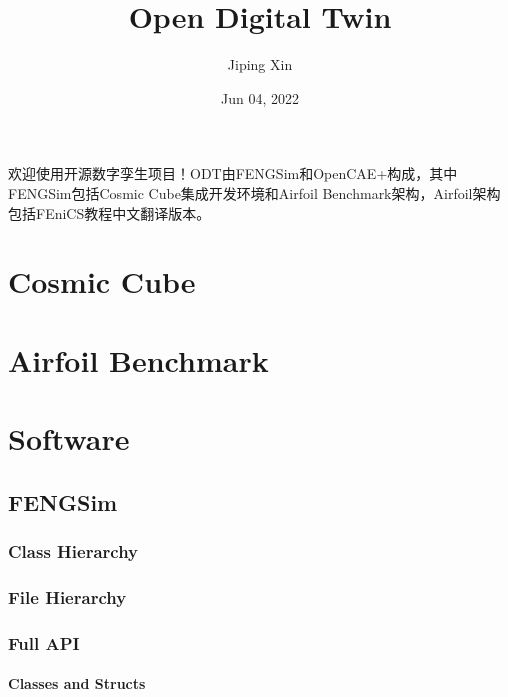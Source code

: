 \documentclass[letterpaper,10pt,english]{sphinxmanual}
\title{Open Digital Twin}
\date{Jun 04, 2022}
\author{Jiping Xin}
\begin{document}
\pagestyle{empty}
\sphinxmaketitle
\pagestyle{plain}
\sphinxtableofcontents
\pagestyle{normal}
\label{\detokenize{index::doc}}
\sphinxAtStartPar
欢迎使用开源数字孪生项目！ODT由FENGSim和OpenCAE+构成，其中FENGSim包括Cosmic Cube集成开发环境和Airfoil Benchmark架构，Airfoil架构包括FEniCS教程中文翻译版本。




\chapter{Cosmic Cube}
\label{\detokenize{index:cosmic-cube}}

\chapter{Airfoil Benchmark}
\label{\detokenize{index:airfoil-benchmark}}

\chapter{Software}
\label{\detokenize{index:software}}
\sphinxstepscope


\section{FENGSim}
\label{\detokenize{api/library_root:fengsim}}\label{\detokenize{api/library_root::doc}}

\subsection{Class Hierarchy}
\label{\detokenize{api/library_root:class-hierarchy}}



\subsection{File Hierarchy}
\label{\detokenize{api/library_root:file-hierarchy}}



\subsection{Full API}
\label{\detokenize{api/library_root:full-api}}

\subsubsection{Classes and Structs}
\label{\detokenize{api/library_root:classes-and-structs}}
\sphinxstepscope
\end{document}
